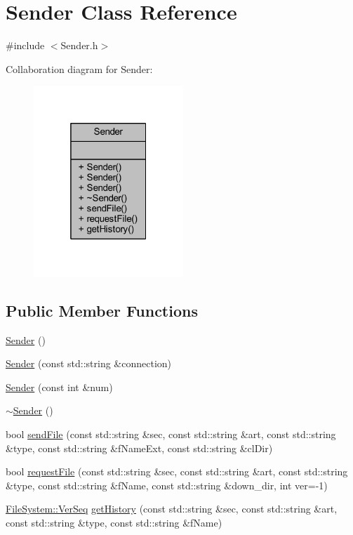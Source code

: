 \hypertarget{class_sender}{}\section{Sender Class Reference}
\label{class_sender}


{\ttfamily \#include $<$Sender.\+h$>$}



Collaboration diagram for Sender\+:
\nopagebreak
\begin{figure}[H]
\begin{center}
\leavevmode
\includegraphics[width=160pt]{class_sender__coll__graph}
\end{center}
\end{figure}
\subsection*{Public Member Functions}
\begin{DoxyCompactItemize}
\item 
\hyperlink{class_sender_ae14150bc5755bf478a7ad1904c017ba1}{Sender} ()
\item 
\hyperlink{class_sender_a2e4d8f4062616f00b51b886b5cd2b873}{Sender} (const std\+::string \&connection)
\item 
\hyperlink{class_sender_ade3d4235ec5eb618c2729355ddb562a6}{Sender} (const int \&num)
\item 
\hyperlink{class_sender_a99dd9c6aa7d546320d619aca9067fdc6}{$\sim$\+Sender} ()
\item 
bool \hyperlink{class_sender_a8e2a5e629882083ec57d3a1b7f129658}{send\+File} (const std\+::string \&sec, const std\+::string \&art, const std\+::string \&type, const std\+::string \&f\+Name\+Ext, const std\+::string \&cl\+Dir)
\item 
bool \hyperlink{class_sender_a40a914e92ccb56e8927e7d51d8bf2817}{request\+File} (const std\+::string \&sec, const std\+::string \&art, const std\+::string \&type, const std\+::string \&f\+Name, const std\+::string \&down\+\_\+dir, int ver=-\/1)
\item 
\hyperlink{namespace_file_system_ac32dc1eb34c060160b52edc7c4e37d6e}{File\+System\+::\+Ver\+Seq} \hyperlink{class_sender_af08d8e303f3fdce05f01f53a7ac7752b}{get\+History} (const std\+::string \&sec, const std\+::string \&art, const std\+::string \&type, const std\+::string \&f\+Name)
\end{DoxyCompactItemize}


